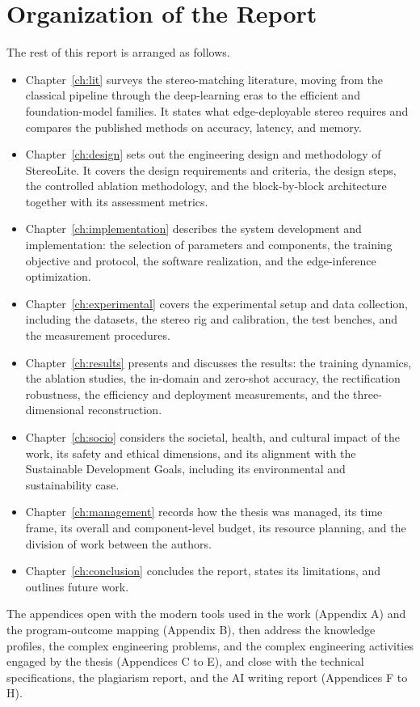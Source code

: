 \section{Organization of the Report}
The rest of this report is arranged as follows.
\begin{itemize}
\item Chapter~\ref{ch:lit} surveys the stereo-matching literature, moving
from the classical pipeline through the deep-learning eras to the efficient
and foundation-model families. It states what edge-deployable stereo
requires and compares the published methods on accuracy, latency, and memory.
\item Chapter~\ref{ch:design} sets out the engineering design and
methodology of StereoLite. It covers the design requirements and criteria,
the design steps, the controlled ablation methodology, and the
block-by-block architecture together with its assessment metrics.
\item Chapter~\ref{ch:implementation} describes the system development and
implementation: the selection of parameters and components, the training
objective and protocol, the software realization, and the edge-inference
optimization.
\item Chapter~\ref{ch:experimental} covers the experimental setup and data
collection, including the datasets, the stereo rig and calibration, the test
benches, and the measurement procedures.
\item Chapter~\ref{ch:results} presents and discusses the results: the
training dynamics, the ablation studies, the in-domain and zero-shot
accuracy, the rectification robustness, the efficiency and deployment
measurements, and the three-dimensional reconstruction.
\item Chapter~\ref{ch:socio} considers the societal, health, and cultural
impact of the work, its safety and ethical dimensions, and its alignment
with the Sustainable Development Goals, including its environmental and
sustainability case.
\item Chapter~\ref{ch:management} records how the thesis was managed, its
time frame, its overall and component-level budget, its resource planning,
and the division of work between the authors.
\item Chapter~\ref{ch:conclusion} concludes the report, states its
limitations, and outlines future work.
\end{itemize}
The appendices open with the modern tools used in the work (Appendix A)
and the program-outcome mapping (Appendix B), then address the knowledge
profiles, the complex engineering problems, and the complex engineering
activities engaged by the thesis (Appendices C to E), and close with the
technical specifications, the plagiarism report, and the AI writing
report (Appendices F to H).

